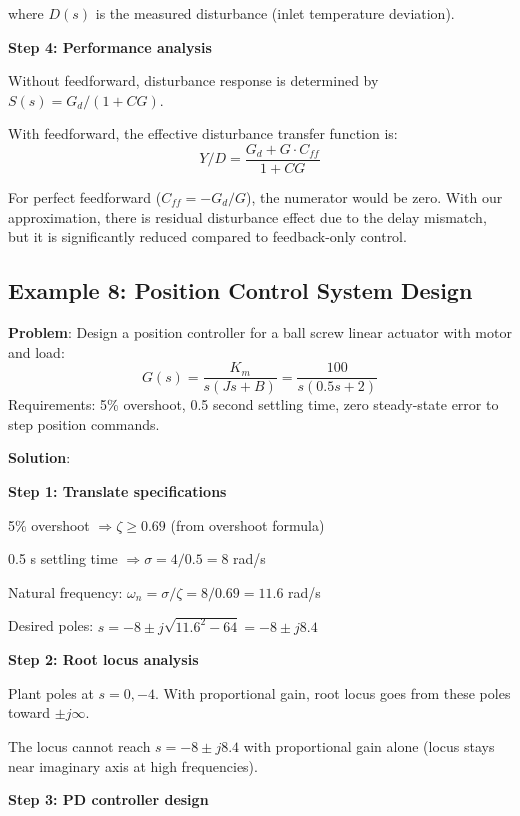 where $D(s)$ is the measured disturbance (inlet temperature deviation).

\textbf{Step 4: Performance analysis}

Without feedforward, disturbance response is determined by $S(s) = G_d/(1+CG)$.

With feedforward, the effective disturbance transfer function is:
\begin{equation}
Y/D = \frac{G_d + G \cdot C_{ff}}{1 + CG}
\end{equation}

For perfect feedforward ($C_{ff} = -G_d/G$), the numerator would be zero. With our approximation, there is residual disturbance effect due to the delay mismatch, but it is significantly reduced compared to feedback-only control.

\subsection{Example 8: Position Control System Design}
\label{subsec:ex_position_control}

\textbf{Problem}: Design a position controller for a ball screw linear actuator with motor and load:
\begin{equation}
G(s) = \frac{K_m}{s(Js + B)} = \frac{100}{s(0.5s + 2)}
\end{equation}
Requirements: 5\% overshoot, 0.5 second settling time, zero steady-state error to step position commands.

\textbf{Solution}:

\textbf{Step 1: Translate specifications}

5\% overshoot $\Rightarrow \zeta \geq 0.69$ (from overshoot formula)

0.5 s settling time $\Rightarrow \sigma = 4/0.5 = 8$ rad/s

Natural frequency: $\omega_n = \sigma/\zeta = 8/0.69 = 11.6$ rad/s

Desired poles: $s = -8 \pm j\sqrt{11.6^2 - 64} = -8 \pm j8.4$

\textbf{Step 2: Root locus analysis}

Plant poles at $s = 0, -4$. With proportional gain, root locus goes from these poles toward $\pm j\infty$.

The locus cannot reach $s = -8 \pm j8.4$ with proportional gain alone (locus stays near imaginary axis at high frequencies).

\textbf{Step 3: PD controller design}

